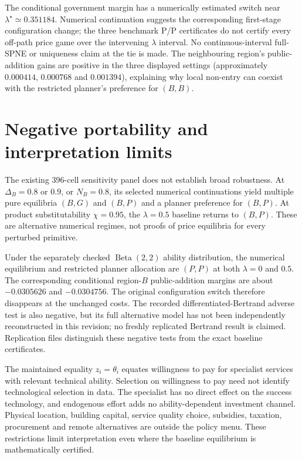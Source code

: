 \documentclass[11pt]{article}
\begin{document}
The conditional government margin has a numerically estimated switch near $\lambda^\star\simeq0.351184$.
Numerical continuation suggests the corresponding first-stage configuration change; the three benchmark P/P certificates do not certify every off-path price game over the intervening $\lambda$ interval.
No continuous-interval full-SPNE or uniqueness claim at the tie is made.
The neighbouring region's public-addition gains are positive in the three displayed settings (approximately $0.000414$, $0.000768$ and $0.001394$), explaining why local non-entry can coexist with the restricted planner's preference for $(B,B)$.

\section{Negative portability and interpretation limits}\label{sec:robustness}
The existing 396-cell sensitivity panel does not establish broad robustness.
At $\Delta_B=0.8$ or $0.9$, or $N_B=0.8$, its selected numerical continuations yield multiple pure equilibria $(B,G)$ and $(B,P)$ and a planner preference for $(B,P)$.
At product substitutability $\chi=0.95$, the $\lambda=0.5$ baseline returns to $(B,P)$.
These are alternative numerical regimes, not proofs of price equilibria for every perturbed primitive.

Under the separately checked $\operatorname{Beta}(2,2)$ ability distribution, the numerical equilibrium and restricted planner allocation are $(P,P)$ at both $\lambda=0$ and $0.5$.
The corresponding conditional region-$B$ public-addition margins are about $-0.0305626$ and $-0.0304756$.
The original configuration switch therefore disappears at the unchanged costs.
The recorded differentiated-Bertrand adverse test is also negative, but its full alternative model has not been independently reconstructed in this revision; no freshly replicated Bertrand result is claimed.
Replication files distinguish these negative tests from the exact baseline certificates.

The maintained equality $z_i=\theta_i$ equates willingness to pay for specialist services with relevant technical ability.
Selection on willingness to pay need not identify technological selection in data.
The specialist has no direct effect on the success technology, and endogenous effort adds no ability-dependent investment channel.
Physical location, building capital, service quality choice, subsidies, taxation, procurement and remote alternatives are outside the policy menu.
These restrictions limit interpretation even where the baseline equilibrium is mathematically certified.
\end{document}
